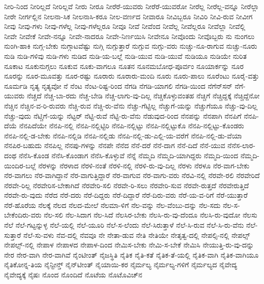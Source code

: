 {ನೀರಿ-ನಿಂದ
ನೀರಿಲ್ಲದೆ
ನೀರಿಲ್ಲವೆ
ನೀರು
ನೀರೂ
ನೀರೆರೆ-ಯುವರು
ನೀರೆರೆ-ಯುವರೋ
ನೀರೆಲ್ಲ
ನೀರೆಲ್ಲ-ವನ್ನೂ
ನೀರೆಲ್ಲಾ
ನೀರೇ
ನೀರ್ಗಲ್ಲಿನ
ನೀಲನಾ-ಸಿಕ
ನೀಲನಾಸಿ-ಕರೂ
ನೀಲ-ವರ್ಣದ
ನೀವಾರೂ
ನೀವಿಬ್ಬರೂ
ನೀವಿರಿ
ನೀವಿ-ರುವ
ನೀವೀಗ
ನೀವು
ನೀವು-ಗಳು
ನೀವು-ಗಳೆಲ್ಲ
ನೀವು-ಗಳೆಲ್ಲರೂ
ನೀವೂ
ನೀವೆ
ನೀವೆಂದ
ನೀವೆಲ್ಲ
ನೀವೆಲ್ಲರೂ
ನೀವೆಲ್ಲಾ
ನೀವೆಲ್ಲಿ
ನೀವೇ
ನೀವೇಕೆ
ನೀವೇ-ನನ್ನೂ
ನೀವೇ-ನಾದರೂ
ನೀವೇ-ನಿರ್ಣಯಿಸಿ
ನೀವೇನೂ
ನೀವೊಂದು
ನೀವೊಬ್ಬರು
ನು
ನುಂಗಲು
ನುಂಗಿ-ಹಾಕಿ
ನುಗ್ಗ-ಬೇಕು
ನುಗ್ಗಾಟವೆಷ್ಟು
ನುಗ್ಗಿ
ನುಗ್ಗುತ್ತಾರೆ
ನುಗ್ಗುವ
ನುಗ್ಗು-ವರು
ನುಚ್ಚು-ನೂ-ರಾಗುವ
ನುಚ್ಚು-ನೂರು
ನುಡಿ
ನುಡಿ-ಗಳಿವು
ನುಡಿ-ಗಳು
ನುಡಿದ
ನುಡಿ-ಯ-ಬಲ್ಲೆ
ನುಡಿ-ಯುವ
ನುಡಿ-ಯುವೆ
ನುಡಿಯೂ
ನುಡಿಯೇ
ನುರಿತ
ನೂಕಾಟ
ನೂಕುನುಗ್ಗಲು
ನೂಕುವ
ನೂಕು-ವಾಗಲೂ
ನೂತನ
ನೂನಮಬೋಧ-ಪೂರ್ವಂ
ನೂಯಾರ್ಕನ್ನು
ನೂರ
ನೂರನ್ನು
ನೂರ-ಮೂವತ್ತು
ನೂರ-ರಷ್ಟು
ನೂರಾರು
ನೂರಾರು-ಮಂದಿ
ನೂರು
ನೂರು-ಪಾಲು
ನೂರೆಂಟು
ನೂರೈ-ವತ್ತು
ನೂರ್ಮಡಿ
ನೃತ್ಯ
ನೃತ್ಯವೋ
ನೆ
ನೆಂಟ
ನೆಂಟ-ರಿಷ್ಟ-ರಿಂದ
ನೆಗಡಿ
ನೆಗಡಿ-ಯಾಗಲಿ
ನೆಗಡಿ-ಯಿಂದ
ನೆಗೆನ್‌ಸನ್
ನೆಗೆ-ಯುವರು
ನೆಚ್ಚದೆ
ನೆಚ್ಚ-ಬಾ-ರದು
ನೆಚ್ಚ-ಬೇಡಿ
ನೆಚ್ಚ-ಲಾಗು-ವು-ದಿಲ್ಲ
ನೆಚ್ಚಿಕೊಳ್ಳುವಂತಹ
ನೆಚ್ಚಿಗೆ
ನೆಚ್ಚಿದ್ದಕ್ಕೆ
ನೆಚ್ಚಿದ್ದೆನೋ
ನೆಚ್ಚಿನ
ನೆಚ್ಚಿನ-ವ-ರಿ-ರುವರು
ನೆಚ್ಚಿ-ರುವ
ನೆಚ್ಚಿ-ರು-ವೆನು
ನೆಚ್ಚು-ಗೆಟ್ಟಿಲ್ಲ
ನೆಚ್ಚುಗೆ-ಯನ್ನು
ನೆಚ್ಚುಗೆಯೂ
ನೆಚ್ಚು-ವು-ದಿಲ್ಲ
ನೆಚ್ಚು-ವುದು
ನೆಟ್ಚಿಗೆ-ಯನ್ನು
ನೆಟ್ಟರ್
ನೆಟ್ಟಿ-ರುವೆ
ನೆಟ್ಟಿ-ರು-ವೆನು
ನೆಡುವುದ-ರಿಂದ
ನೆನಪನ್ನು
ನೆನಪಾಗಿ
ನೆನಪಿಗೆ
ನೆನಪಿ-ದೆಯೆ
ನೆನಪಿದೆಯೇ
ನೆನಪಿ-ನಲ್ಲಿ
ನೆನಪಿ-ನಲ್ಲಿಟ್ಟಿರಿ
ನೆನಪಿ-ನಲ್ಲಿಟ್ಟು
ನೆನಪಿ-ನಲ್ಲಿಟ್ಟುಕೊ
ನೆನಪಿ-ನಲ್ಲಿಟ್ಟು-ಕೊಂಡರು
ನೆನಪಿ-ನಲ್ಲಿ-ಡ-ಬೇಕು
ನೆನಪಿ-ನಲ್ಲಿಡಿ
ನೆನಪಿ-ನಲ್ಲಿಡು
ನೆನಪಿ-ನಲ್ಲಿ-ಡು-ಎಲ್ಲಿ-ಯ-ವರೆಗೆ
ನೆನಪಿ-ನಲ್ಲಿ-ಡು-ವೆಯಾ
ನೆನಪಿರ-ಬಹುದು
ನೆನಪಿಲ್ಲ
ನೆನಪು-ಗಳನ್ನು
ನೆನಪೇ
ನೆನೆದ
ನೆನೆ-ದರೆ
ನೆನೆ-ದಾಗ
ನೆನೆ-ದಿದೆ
ನೆನೆ-ಯುವ
ನೆನೆಸ-ಲಾರ-ದಂಥ
ನೆನೆಸಿ-ಕೊಂಡ
ನೆನೆಸಿ-ಕೊಂಡಾಗ
ನೆನೆಸಿ-ಕೊಳ್ಳುವೆ
ನೆನ್ನೆ
ನೆಮ್ಮದಿ
ನೆಮ್ಮದಿ-ಯಾಗಿದ್ದರು
ನೆಮ್ಮದಿ-ಯಿಂದ
ನೆಮ್ಮದಿ-ಯಿಂದಿರ-ಬಲ್ಲೆ
ನೆರಳನ್ನು
ನೆರಳಾದ
ನೆರಳಿ-ನಂತೆ
ನೆರಳಿ-ನಲ್ಲಿ
ನೆರಳಿ-ರು-ವು-ದಿಲ್ಲ
ನೆರಳು
ನೆರಳೂ
ನೆರ-ವಾಗ-ಬೇಕು
ನೆರ-ವಾಗಲು
ನೆರ-ವಾಗಿದ್ದಾನೆ
ನೆರ-ವಾಗುತ್ತಿದ್ದಾರೆ
ನೆರ-ವಾಗುವ
ನೆರ-ವಾಗು-ವರು
ನೆರವಿ-ನಲ್ಲಿ
ನೆರವೇ-ರಲಿ
ನೆರವೇರಿದೆ
ನೆರವೇ-ರಿಲ್ಲ
ನೆರವೇರಿಸ-ಬೇಕಾಗಿದೆ
ನೆರವೇರಿ-ಸಲಿ
ನೆರವೇ-ರಿ-ಸಲು
ನೆರವೇರಿ-ಸುವ
ನೆರವೇ-ರುತ್ತದೆ
ನೆರವೇರುತ್ತಿದೆ
ನೆರವೇ-ರು-ವುದು
ನೆರೆದ
ನೆರೆ-ದರು
ನೆರೆ-ದಿದ್ದರು
ನೆರೆ-ದಿದ್ದಾರೆ
ನೆರೆ-ದಿರು-ವರು
ನೆರೆ-ಯ-ವ-ರಿಗೆ
ನೆರೆ-ಯುತ್ತಾರೆ
ನೆರೆ-ಹೊರೆಯ
ನೆಲಕ್ಕೆ
ನೆಲದ
ನೆಲದ-ಮೇಲೆ
ನೆಲಮಾ-ಳಿಗೆ
ನೆಲ-ವನ್ನು
ನೆಲ-ವೆಂಬು-ದನ್ನು
ನೆಲ-ಸದು
ನೆಲ-ಸ-ಬೇಕೆಂದಿರು-ವರು
ನೆಲ-ಸಲಿ
ನೆಲ-ಸಿದಾಗ
ನೆಲ-ಸಿದೆ
ನೆಲಸಿರ-ಬೇಕು
ನೆಲಸಿ-ರು-ವು-ದೆಂದೂ
ನೆಲಸಿ-ರು-ವುದೋ
ನೆಲಸು
ನೆಲೆ
ನೆಲೆ-ಗಟ್ಟನ್ನುಳ್ಳ
ನೆಲೆ-ಯಲ್ಲಿ
ನೆಲೆ-ಯೂರಿ
ನೆಲೆ-ಸ-ಲೆಂದು
ನೆಲೆ-ಸಿರುತ್ತಾಳೆ
ನೆಲೆ-ಸಿ-ರುವ
ನೆಲೆ-ಸಿ-ರು-ವೆನು
ನೆಲೆ-ಸುತ್ತಾರೆ
ನೆಲೆ-ಸು-ವಳು
ನೆವ-ದಲ್ಲಿ
ನೆವವೂ
ನೇ
ನೇತಾ-ಡುವ
ನೇತಿ
ನೇತಿಯೇ
ನೇತೃತ್ವ-ದಲ್ಲಿ
ನೇಪಲ್ಸಿ-ನಲ್ಲಿ
ನೇಪಲ್ಸ್
ನೇಪಲ್ಸ್‌-ನಲ್ಲಿ
ನೇಪಾಳ
ನೇಪಾಳದ
ನೇಪಾಳ-ದಿಂದ
ನೇಮಿಸ-ಬೇಕು
ನೇಮಿ-ಸ-ಬೇಕೆ
ನೇಮಿಸಿ
ನೇಯುತ್ತಿ-ರು-ವು-ದನ್ನು
ನೇರ
ನೇರ-ವಾಗಿ
ನೇರ-ವಾಗಿವೆ
ನೈಂಟೀಂತ್
ನೈಜಸ್ಥಿತಿ
ನೈತಿಕ
ನೈತಿ-ಕತೆ
ನೈತಿಕ-ತೆ-ಯಲ್ಲಿ
ನೈತಿಕ-ವಾಗಿ
ನೈತಿಕ-ವಾಗಿಯೂ
ನೈತಿಕೋನ್ನ-ತಿಯ
ನೈನ್ಟೀನ್ತ್
ನೈನ್‌ಟೀಂತ್
ನೈಯಾಯಿ-ಕರ
ನೈರ್ಮಲ್ಯ
ನೈರ್ಮಲ್ಯ-ಗಳಿಗೆ
ನೈರ್ಮಲ್ಯದ
ನೈವೇದ್ಯ
ನೈವೇದ್ಯಕ್ಕೆ
ನೈಷಃ
ನೊಂದ
ನೊಂದಿದೆ
ನೊಟೆಯ
ನೊಟೊವಿಚ್‌ನ
}
